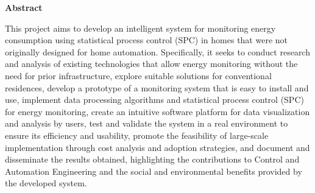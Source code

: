 
\begin{center}
\huge{{\bf Abstract}}
\vspace{2cm}
\end{center}

This project aims to develop an intelligent system for monitoring energy consumption using statistical process control (SPC) in homes that were not originally designed for home automation. Specifically, it seeks to conduct research and analysis of existing technologies that allow energy monitoring without the need for prior infrastructure, explore suitable solutions for conventional residences, develop a prototype of a monitoring system that is easy to install and use, implement data processing algorithms and statistical process control (SPC) for energy monitoring, create an intuitive software platform for data visualization and analysis by users, test and validate the system in a real environment to ensure its efficiency and usability, promote the feasibility of large-scale implementation through cost analysis and adoption strategies, and document and disseminate the results obtained, highlighting the contributions to Control and Automation Engineering and the social and environmental benefits provided by the developed system.
\clearpage
\thispagestyle{empty}
\cleardoublepage
